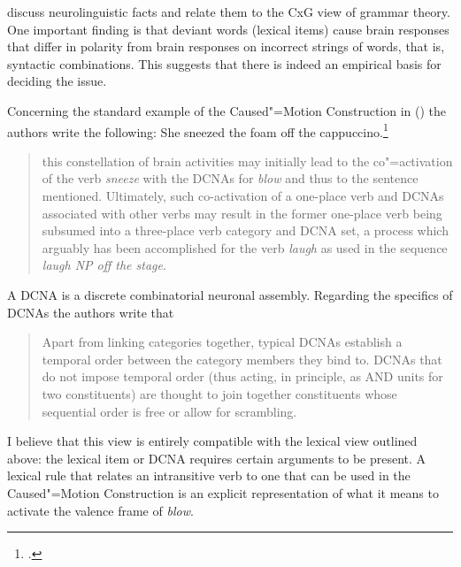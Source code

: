 \begin{exe}
\begin{xlist}[iv.]
\begin{exe}
\begin{xlist}[iv.]
\mbox{}\citet*{PCShandbookCxG} discuss neurolinguistic facts and relate them to the CxG view of grammar
theory. One important finding is that deviant words (lexical items) cause brain responses that differ in polarity
from brain responses on incorrect strings of words, that is, syntactic combinations. This suggests
that there is indeed an empirical basis for deciding the issue.

Concerning the standard example of the Caused"=Motion Construction in () the authors write the
following:
\ea
She sneezed the foam off the cappuccino.\footnote{%
.
}
\z
\begin{quote}
  this constellation of brain activities may initially lead to the co"=activation of the verb \emph{sneeze}
  with the DCNAs for \emph{blow} and thus to the sentence mentioned. Ultimately, such co-activation of a
  one-place verb and DCNAs associated with other verbs may result in the former one-place verb being
  subsumed into a three-place verb category and DCNA set, a process which arguably has been
  accomplished for the verb \emph{laugh} as used in the sequence \emph{laugh NP off the stage}. \citep*{PCShandbookCxG}
\end{quote}
A DCNA is a discrete combinatorial neuronal assembly. Regarding the specifics of DCNAs the authors write that 
\begin{quote}
Apart from linking categories together, typical DCNAs establish a temporal order between the
category members they bind to. DCNAs that do not impose temporal order (thus acting, in principle,
as AND units for two constituents) are thought to join together constituents whose sequential order
is free or allow for scrambling. \citep*[]{PCShandbookCxG}
\end{quote}
I believe that this view is entirely compatible with the lexical view outlined above: the lexical
item or DCNA requires certain arguments to be present. A lexical rule that relates an intransitive verb
to one that can be used in the Caused"=Motion Construction is an
explicit representation of what it means to activate the valence frame of \emph{blow}.


\end{xlist}
\end{exe}
\end{xlist}
\end{exe}
